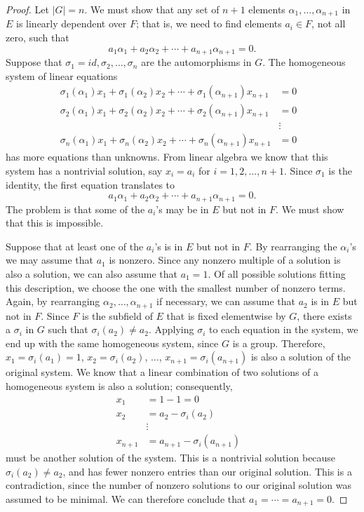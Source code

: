  
\begin{proof}
Let $|G| = n$. We must show that any set of $n+1$ elements $\alpha_1,
\ldots, \alpha_{n+1}$ in $E$ is linearly dependent over $F$; that is,
we need to find elements $a_i \in F$, not all zero, such that 
\[
a_1 \alpha_1 + a_2 \alpha_2 + \cdots + a_{n+1} \alpha_{n+1} = 0.
\]
Suppose that $\sigma_1 = id, \sigma_2, \ldots, \sigma_n$ are the
automorphisms in $G$. The homogeneous system of linear
equations 
\begin{align*}
\sigma_1( \alpha_1 ) x_1 + \sigma_1(\alpha_2) x_2 + \cdots +
\sigma_1(\alpha_{n+1} ) x_{n+1} & = 0 \\
\sigma_2( \alpha_1 ) x_1 + \sigma_2(\alpha_2) x_2 + \cdots +
\sigma_2(\alpha_{n+1} ) x_{n+1} & = 0 \\
& \vdots & \\
\sigma_n( \alpha_1 ) x_1 + \sigma_n(\alpha_2) x_2 + \cdots +
\sigma_n(\alpha_{n+1} ) x_{n+1} & = 0
\end{align*}
has more equations than unknowns. From linear algebra we know that
this system has a nontrivial solution, say $x_i = a_i$ for $i = 1, 2,
\ldots, n+1$. Since $\sigma_1$ is the identity, the first equation
translates to
\[
a_1 \alpha_1 +  a_2 \alpha_2  + \cdots + a_{n+1} \alpha_{n+1} = 0.
\]
The problem is that some of the $a_i$'s may be in $E$ but not in $F$. 
We must show that this is impossible.
 
 
Suppose that at least one of the $a_i$'s is in $E$ but not in $F$. By
rearranging the $\alpha_i$'s we may assume that $a_1$ is nonzero.
Since any nonzero multiple of a solution is also a solution, we can
also assume that $a_1 = 1$. Of all possible solutions fitting this
description, we choose the one with the smallest number of nonzero terms.
Again, by rearranging $\alpha_2, \ldots, \alpha_{n+1}$ if necessary,
we can assume that $a_2$ is in $E$ but not in $F$. Since $F$ is the
subfield of $E$ that is fixed elementwise by $G$, there exists a
$\sigma_i$ in $G$ such that $\sigma_i( a_2 ) \neq a_2$. Applying
$\sigma_i$ to each equation in the system, we end up with the same
homogeneous system, since $G$ is a group. Therefore, $x_1 =
\sigma_i(a_1) = 1$, $x_2 = \sigma_i(a_2)$, $\ldots$, $x_{n+1} =
\sigma_i(a_{n+1} )$ is also a solution of the original system. We know
that a linear combination of two solutions of a homogeneous system is
also a solution; consequently,   
\begin{align*}
x_1 & = 1 -1 = 0 \\
x_2 & = a_2 - \sigma_i(a_2) \\
& \vdots & \\
x_{n+1} & = a_{n+1} - \sigma_i(a_{n+1}) 
\end{align*}
must be another solution of the system. This is a nontrivial solution
because $\sigma_i( a_2 ) \neq a_2$, and has fewer nonzero entries than
our original solution. This is a contradiction, since the number of
nonzero solutions to our original solution was assumed to be minimal.
We can therefore conclude that $a_1 = \cdots = a_{n+1} = 0$.
\end{proof}
 
